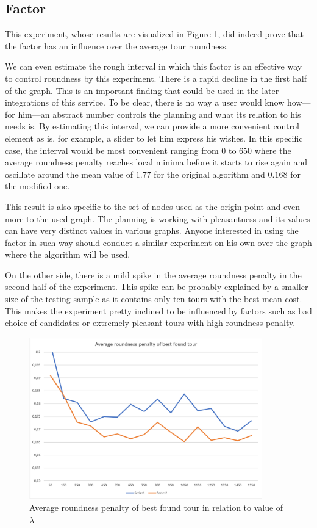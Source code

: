 \documentclass{ctuthesis}
\begin{document}
\subsection{Factor}
This experiment, whose results are visualized in Figure \ref{fig:factorBest}, did indeed prove that the factor has an influence over the average tour roundness. \par
We can even estimate the rough interval in which this factor is an effective way to control roundness by this experiment. There is a rapid decline in the first half of the graph. This is an important finding that could be used in the later integrations of this service. To be clear, there is no way a user would know how—for him—an abstract number controls the planning and what its relation to his needs is. By estimating this interval, we can provide a more convenient control element as is, for example, a slider to let him express his wishes. In this specific case, the interval would be most convenient ranging from \(0\) to \(650\) where the average roundness penalty reaches local minima before it starts to rise again and oscillate around the mean value of \(1.77\) for the original algorithm and \(0.168\) for the modified one. \par
This result is also specific to the set of nodes used as the origin point and even more to the used graph. The planning is working with pleasantness and its values can have very distinct values in various graphs. Anyone interested in using the factor in such way should conduct a similar experiment on his own over the graph where the algorithm will be used.\par
On the other side, there is a mild spike in the average roundness penalty in the second half of the experiment. This spike can be probably explained by a smaller size of the testing sample as it contains only ten tours with the best mean cost. This makes the experiment pretty inclined to be influenced by factors such as bad choice of candidates or extremely pleasant tours with high roundness penalty. \par

\begin{figure}
	\includegraphics[width=0.9\textwidth]{factorBest.png}
	\caption{Average roundness penalty of best found tour in relation to value of \(\lambda\)}
	\label{fig:factorBest}
\end{figure}
\end{document}
